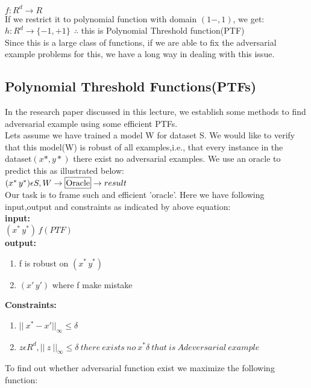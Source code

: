 \documentclass[12pt]{article}
\begin{document}
    $f:R^d \rightarrow R $ \\
    
    If we restrict it to polynomial function with domain $(1-,1)$, we get: \\
    
    $h:R^d \rightarrow \{-1,+1\}~~\therefore$ 
    this is Polynomial Threshold function(PTF) \\
    
    Since this is a large class of functions, if we are able to fix the adversarial example problems for this, we have a long way in dealing with this issue.
    \\
    \subsection{Polynomial Threshold Functions(PTFs)}
    In the research paper discussed in this lecture, we establish some methods to find adversarial example using some efficient PTFs.\\
    Lets assume we have trained a model W for dataset S. We would like to verify that this model(W) is robust of all examples,i.e., that every instance in the dataset$(x*,y*)$ there exist no adversarial examples. We use an oracle to predict this as illustrated below:\\
    
    $(x^*\,y^*)\epsilon S, W \rightarrow \framebox[1.1\width]{Oracle} \rightarrow{result} $ \\
    
    Our task is to frame such and efficient 'oracle'. Here we have following input,output and constraints as indicated by above equation: \\
    
    \textbf{input:}\\
    
    $(x^*\,y^*)\,f(PTF)$ \\

    \textbf{output:} 
    \begin{enumerate}
    \item f is robust on $(x^*\,y^*)$
    \item $(x'\,y')$ where f make mistake
    \end{enumerate}
    \textbf{Constraints:}
    \begin{enumerate}
    \item ${\vert \vert\ x^*-x' \vert \vert}_\infty \leq \delta$
    \item $z \epsilon R^d , {\vert \vert\ z ~\vert \vert}_\infty \leq \delta~there~exists~no~x^*\delta~that~is~Adeversarial~example$
    \end{enumerate}
    To find out whether adversarial function exist we maximize the following function: \\
    
\end{document}

